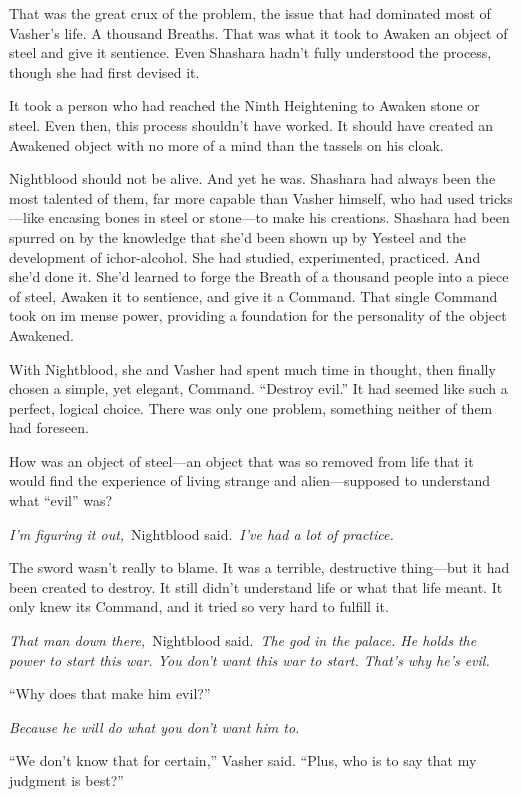 That was the great crux of the problem, the issue that had dominated most of Vasher’s life. A thousand Breaths. That was what it took to Awaken an object of steel and give it sentience. Even Shashara hadn’t fully understood the process, though she had first devised it.

It took a person who had reached the Ninth Heightening to Awaken stone or steel. Even then, this process shouldn’t have worked. It should have created an Awakened object with no more of a mind than the tassels on his cloak.

Nightblood should not be alive. And yet he was. Shashara had always been the most talented of them, far more capable than Vasher himself, who had used tricks—like encasing bones in steel or stone—to make his creations. Shashara had been spurred on by the knowledge that she’d been shown up by Yesteel and the development of ichor-alcohol. She had studied, experimented, practiced. And she’d done it. She’d learned to forge the Breath of a thousand people into a piece of steel, Awaken it to sentience, and give it a Command. That single Command took on im mense power, providing a foundation for the personality of the object Awakened.

With Nightblood, she and Vasher had spent much time in thought, then finally chosen a simple, yet elegant, Command. “Destroy evil.” It had seemed like such a perfect, logical choice. There was only one problem, something neither of them had foreseen.

How was an object of steel—an object that was so removed from life that it would find the experience of living strange and alien—supposed to understand what “evil” was?

\textit{I’m figuring it out,}~Nightblood said.~\textit{I’ve had a lot of practice.}

The sword wasn’t really to blame. It was a terrible, destructive thing—but it had been created to destroy. It still didn’t understand life or what that life meant. It only knew its Command, and it tried so very hard to fulfill it.

\textit{That man down there,}~Nightblood said.~\textit{The god in the palace. He holds the power to start this war. You don’t want this war to start. That’s why he’s evil.}

“Why does that make him evil?”

\textit{Because he will do what you don’t want him to.}

“We don’t know that for certain,” Vasher said. “Plus, who is to say that my judgment is best?”

